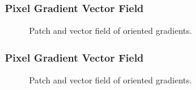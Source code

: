 \documentclass[aspectratio=169]{beamer}
\begin{document}
\begin{frame}
\frametitle{Pixel Gradient Vector Field}
\begin{center}
\begin{figure}[h!]
\centering
\setlength\fboxsep{0pt}
\setlength\fboxrule{0.5pt}
\caption[Histogram of Gradient Orientations]{Patch and vector field of oriented gradients.}
\label{fig:sampledescriptor}
\end{figure}
\end{center}
\end{frame}

\begin{frame}
\frametitle{Pixel Gradient Vector Field}
\begin{center}
\begin{figure}[h!]
\centering
\setlength\fboxsep{0pt}
\setlength\fboxrule{0.5pt}
\caption[Histogram of Gradient Orientations]{Patch and vector field of oriented gradients.}
\label{fig:sampledescriptor}
\end{figure}
\end{center}
\end{frame}
\end{document}

